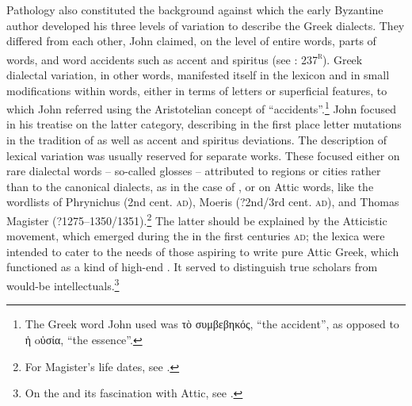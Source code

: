 Pathology also constituted the background against which the early Byzantine author  developed his three levels of variation to describe the Greek dialects. They differed from each other, John claimed, on the level of entire words, parts of words, and word accidents such as accent and spiritus (see \citealt{Manutius1496Thesaurus}: 237\textsc{\textsuperscript{r}}). Greek dialectal variation, in other words, manifested itself in the lexicon and in small modifications within words, either in terms of letters or superficial features, to which John referred using the Aristotelian concept of “accidents”.\footnote{The Greek word John used was τὸ συμβεβηκός, “the accident”, as opposed to ἡ oὐσία, “the essence”.} John focused in his treatise on the latter category, describing in the first place letter mutations in the tradition of  as well as accent and spiritus deviations. The description of lexical variation was usually reserved for separate works. These focused either on rare dialectal words – so-called glosses – attributed to regions or cities rather than to the canonical dialects, as in the case of , or on Attic words, like the wordlists of Phrynichus (2nd cent. \textsc{ad}), Moeris (?2nd/3rd cent. \textsc{ad}), and Thomas Magister (?1275–1350/1351).\footnote{{For Magister’s life dates, see \citet[417]{Baloglou1998}.}} The latter should be explained by the Atticistic movement, which emerged during the  in the first centuries \textsc{ad}; the lexica were intended to cater to the needs of those aspiring to write pure Attic Greek, which functioned as a kind of high-end . It served to distinguish true scholars from would-be intellectuals.\footnote{On the  and its fascination with Attic, see \citet{Whitmarsh2005}.}



